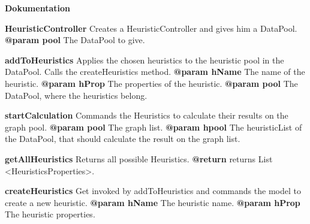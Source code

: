 \textbf{Dokumentation}
\begin{enumerate}[+]
	\item{
	\textbf{HeuristicController} \newline
	Creates a HeuristicController and gives him a DataPool. \newline
	\textbf{@param pool} The DataPool to give. \newline
}
	\item{
	\textbf{addToHeuristics} \newline
	Applies the chosen heuristics to the heuristic pool in the DataPool. Calls the createHeuristics method. \newline
	\textbf{@param hName } The name of the heuristic. \newline
	\textbf{@param hProp } The properties of the heuristic. \newline
	\textbf{@param pool } The DataPool, where the heuristics belong. \newline
}
	\item{
	\textbf{startCalculation} \newline
	Commands the Heuristics to calculate their results on the graph pool. \newline
	\textbf{@param pool} The graph list.  \newline
	\textbf{@param hpool} The heuristicList of the DataPool, that should calculate the result on the graph list.  \newline
}
	\item{
	\textbf{getAllHeuristics} \newline
	Returns all possible Heuristics. \newline
	\textbf{@return} returns List <HeuristicsProperties>.  \newline
}
	\item[\#]{
	\item{
	\textbf{createHeuristics} \newline
	Get invoked by addToHeuristics and commands the model to create a new heuristic. \newline
	\textbf{@param hName} The heuristic name. \newline
	\textbf{@param hProp} The heuristic properties. \newline
}}
\end{enumerate}